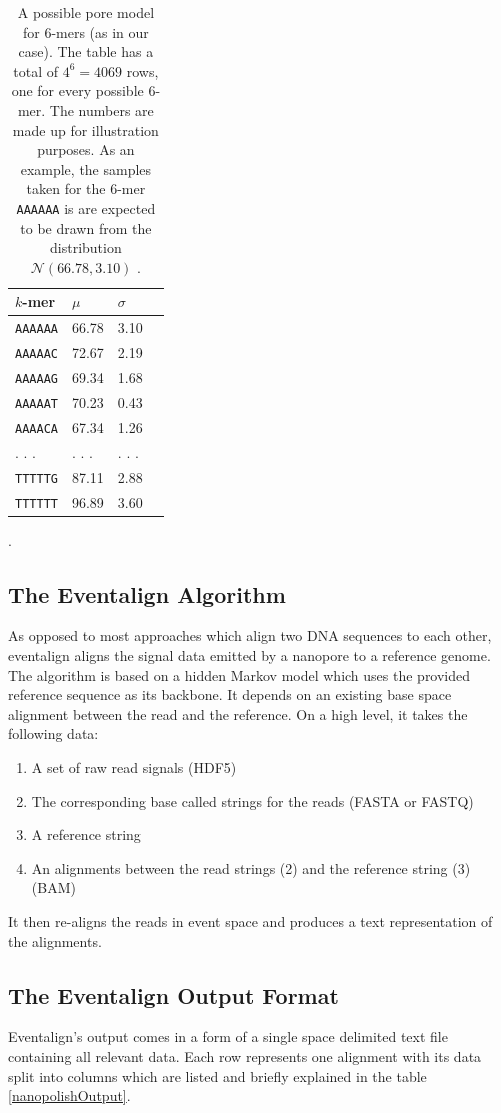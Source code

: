\documentclass[times, utf, seminar]{fer}
\begin{document}
\begin{table}
	\centering
	\begin{tabular}{l l l l}
		$k$-mer & $\mu$ & $\sigma$  \\	
		\hline{}
		\texttt{AAAAAA} & 66.78 & 3.10  \\
		\texttt{AAAAAC} & 72.67 & 2.19 \\
		\texttt{AAAAAG} & 69.34 & 1.68 \\
		\texttt{AAAAAT} & 70.23 & 0.43 \\
		\texttt{AAAACA} & 67.34 & 1.26 \\
		. . .  & . . . & . . .  \\
		\texttt{TTTTTG} & 87.11 & 2.88 \\
		\texttt{TTTTTT} & 96.89 & 3.60 \\
	\end{tabular}
	\caption{A possible pore model for $6$-mers (as in our case). The table has a total of $4^6 = 4069$ rows, one for every possible $6$-mer. The numbers are made up for illustration purposes. As an example, the samples taken for the $6$-mer \texttt{AAAAAA} is are expected to be drawn from the distribution $\mathcal{N}(66.78, 3.10)$ \citep{simpson}.}.
	\label{poreModel}
\end{table}

\subsection{The Eventalign Algorithm}
As opposed to most approaches which align two DNA sequences to each other, eventalign aligns 
the signal data emitted by a nanopore to a reference genome. The algorithm is based on a hidden Markov model which uses the provided reference sequence as its backbone. It depends on an existing base space alignment between the read and the reference. On a high level, it takes the following data:
\begin{enumerate}
	\item A set of raw read signals (HDF5)
	\item The corresponding base called strings for the reads (FASTA or FASTQ)
	\item A reference string
	\item An alignments between the read strings (2) and the reference string (3) (BAM)
\end{enumerate}
It then re-aligns the reads in event space and produces a text representation of the alignments.
\subsection{The Eventalign Output Format}
Eventalign's output comes in a form of a single space delimited text file containing all relevant data. Each row represents one alignment with its data split into columns which are listed and briefly explained in the table \ref{nanopolishOutput}.
\end{document}
